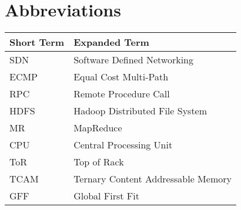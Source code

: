 \chapter{Abbreviations}

\begin{tabular}{p{40mm}|p{100mm}}
	\textbf{Short Term}&\textbf{Expanded Term}\\
	\hline
	SDN&Software Defined Networking\\
	ECMP&Equal Cost Multi-Path\\
    RPC&Remote Procedure Call\\
	HDFS&Hadoop Distributed File System\\
    MR&MapReduce\\
    CPU&Central Processing Unit \\
    ToR&Top of Rack \\
    TCAM&Ternary Content Addressable Memory \\
    GFF&Global First Fit
\end{tabular}
